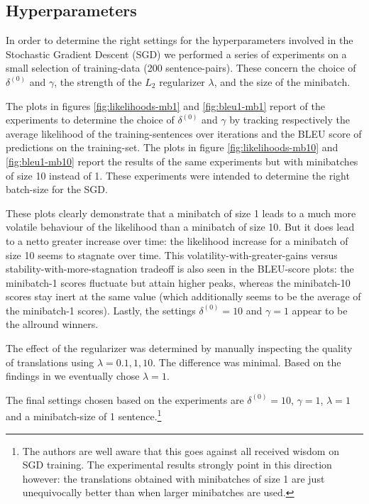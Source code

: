 \documentclass[11pt,a4paper]{article}
\begin{document}
\subsection{Hyperparameters}
In order to determine the right settings for the hyperparameters involved in the Stochastic Gradient Descent (SGD) we performed a series of experiments on a small selection of training-data (200 sentence-pairs). These concern the choice of $\delta^{(0)}$ and $\gamma$, the strength of the $L_2$ regularizer $\lambda$, and the size of the minibatch. 

The plots in figures \ref{fig:likelihoods-mb1} and \ref{fig:bleu1-mb1} report of the experiments to determine the choice of $\delta^{(0)}$ and $\gamma$ by tracking respectively the average likelihood of the training-sentences over iterations and the BLEU score of predictions on the training-set. The plots in figure \ref{fig:likelihoods-mb10} and \ref{fig:bleu1-mb10} report the results of the same experiments but with minibatches of size 10 instead of 1. These experiments were intended to determine the right batch-size for the SGD.

These plots clearly demonstrate that a minibatch of size 1 leads to a much more volatile behaviour of the likelihood than a minibatch of size 10. But it does lead to a netto greater increase over time: the likelihood increase for a minibatch of size 10 seems to stagnate over time. This volatility-with-greater-gains versus stability-with-more-stagnation tradeoff is also seen in the BLEU-score plots: the minibatch-1 scores fluctuate but attain higher peaks, whereas the minibatch-10 scores stay inert at the same value (which additionally seems to be the average of the minibatch-1 scores). Lastly, the settings $\delta^{(0)}=10$ and $\gamma=1$ appear to be the allround winners.

The effect of the regularizer was determined by manually inspecting the quality of translations using $\lambda = 0.1, 1, 10$. The difference was minimal. Based on the findings in \cite{blunsom2008discriminative} we eventually chose $\lambda=1$. 

The final settings chosen based on the experiments are $\delta^{(0)}=10$, $\gamma=1$, $\lambda=1$ and a minibatch-size of 1 sentence.\footnote{The authors are well aware that this goes against all received wisdom on SGD training. The experimental results strongly point in this direction however: the translations obtained with minibatches of size 1 are just unequivocally better than when larger minibatches are used.}
\end{document}
